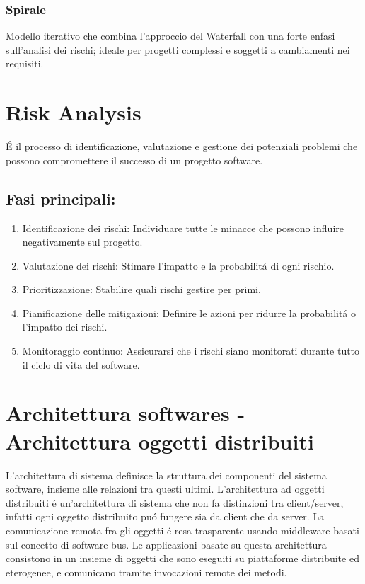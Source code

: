 \documentclass[11pt]{article}
\begin{document}
\subsubsection{Spirale}
\label{sec:org2cbfb0c}
Modello iterativo che combina l'approccio del Waterfall con una forte enfasi sull'analisi dei rischi; ideale per progetti complessi e soggetti a cambiamenti nei requisiti.
\section{Risk Analysis}
\label{sec:org7597908}
É il processo di identificazione, valutazione e gestione dei potenziali problemi che possono compromettere il successo di un progetto software.
\subsection{Fasi principali:}
\label{sec:org4d94ef0}
\begin{enumerate}
\item Identificazione dei rischi:
Individuare tutte le minacce che possono influire negativamente sul progetto.

\item Valutazione dei rischi:
Stimare l'impatto e la probabilitá di ogni rischio.

\item Prioritizzazione:
Stabilire quali rischi gestire per primi.

\item Pianificazione delle mitigazioni:
Definire le azioni per ridurre la probabilitá o l'impatto dei rischi.

\item Monitoraggio continuo:
Assicurarsi che i rischi siano monitorati durante tutto il ciclo di vita del software.
\end{enumerate}
\section{Architettura softwares - Architettura oggetti distribuiti}
\label{sec:orgf8b5a05}
L'architettura di sistema definisce la struttura dei componenti del sistema software, insieme alle relazioni tra questi ultimi.
L'architettura ad oggetti distribuiti é un'architettura di sistema che non fa distinzioni tra client/server, infatti ogni oggetto distribuito puó fungere sia da client che da server.
La comunicazione remota fra gli oggetti é resa trasparente usando middleware basati sul concetto di software bus.
Le applicazioni basate su questa architettura consistono in un insieme di oggetti che sono eseguiti su piattaforme distribuite ed eterogenee, e comunicano tramite invocazioni remote dei metodi.
\end{document}
